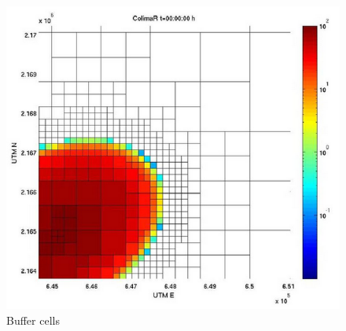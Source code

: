 \documentclass[letterpaper,10pt]{article}
\begin{document}
\begin{figure}[!h]
\begin{center}
\includegraphics[scale=.3]{IMAGES/buffercells.png}
\caption{Buffer cells}
\label{bufcell}
\end{center}
\end{figure} 
\end{document}
